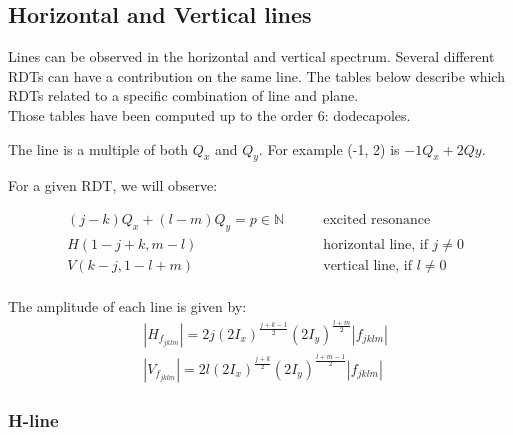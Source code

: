 \documentclass[openright,twoside,headsepline,bibliography=totoc]{scrbook}
\begin{document}
\newpage

\hypertarget{horizontal-and-vertical-lines}{%
\subsection{Horizontal and Vertical lines}\label{horizontal-and-vertical-lines}}

Lines can be observed in the horizontal and vertical spectrum. Several
different RDTs can have a contribution on the same line. The tables
below describe which RDTs related to a specific combination of line and
plane.\\
Those tables have been computed up to the order 6: dodecapoles.

The line is a multiple of both \(Q_x\) and \(Q_y\). For example (-1, 2)
is \(-1Q_x + 2Qy\).

For a given RDT, we will observe:

\begin{equation}\begin{aligned}
& (j-k)Q_x + (l-m)Q_y = p \in \mathbb{N} \quad\quad& \mbox{excited resonance}\\
& H(1 - j + k, m - l) \quad\quad& \mbox{horizontal line, if } j \ne 0 \\
& V(k - j, 1 - l + m) \quad\quad& \mbox{vertical line, if } l \ne 0 \\
\end{aligned}\end{equation}

The amplitude of each line is given by:
\begin{equation}
    \begin{aligned}
    &|H_{f_{jklm}}| = 2 j (2 I_x)^\frac{j+k-1}{2} (2 I_y)^\frac{l+m}{2} |f_{jklm}| \\
    &|V_{f_{jklm}}| = 2 l (2 I_x)^\frac{j+k}{2} (2 I_y)^\frac{l+m-1}{2} |f_{jklm}|
    \label{eq:amplitude_fjklm}
    \end{aligned}
\end{equation}

\hypertarget{h-line}{%
\subsubsection{H-line}\label{h-line}}
\end{document}
